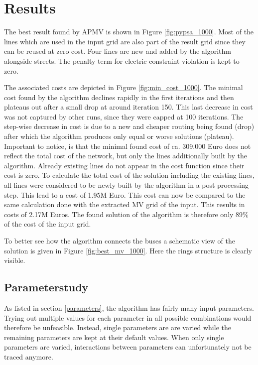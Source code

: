 %

\section{Results}



The best result found by APMV is shown in Figure \ref{fig:pypsa_1000}. Most of the lines which are used in the input grid are also part of the result grid since they can be reused at zero cost. Four lines are new and added by the algorithm alongside streets. The penalty term for electric constraint violation is kept to zero.



The associated costs are depicted in Figure \ref{fig:min_cost_1000}. The minimal cost found by the algorithm declines rapidly in the first iterations and then plateaus out after a small drop at around iteration 150. This last decrease in cost was not captured by other runs, since they were capped at 100 iterations. The step-wise decrease in cost is due to a new and cheaper routing being found (drop) after which the algorithm produces only equal or worse solutions (plateau). Important to notice, is that the minimal found cost of ca. 309.000 Euro does not reflect the total cost of the network, but only the lines additionally built by the algorithm. Already existing lines do not appear in the cost function since their cost is zero. To calculate the total cost of the solution including the existing lines, all lines were considered to be newly built by the algorithm in a post processing step. This lead to a cost of 1.95M Euro. This cost can now be compared to the same calculation done with the extracted MV grid of the input. This results in costs of 2.17M Euros. The found solution of the algorithm is therefore only 89\% of the cost of the input grid.





To better see how the algorithm connects the buses a schematic view of the solution is given in Figure \ref{fig:best_mv_1000}. Here the rings structure is clearly visible. 





\subsection{Parameterstudy}
As listed in section \ref{parameters}, the algorithm has fairly many input parameters. Trying out multiple values for each parameter in all possible combinations would therefore be unfeasible. Instead, single parameters are are varied while the remaining parameters are kept at their default values. When only single parameters are varied, interactions between parameters can unfortunately not be traced anymore. \\

